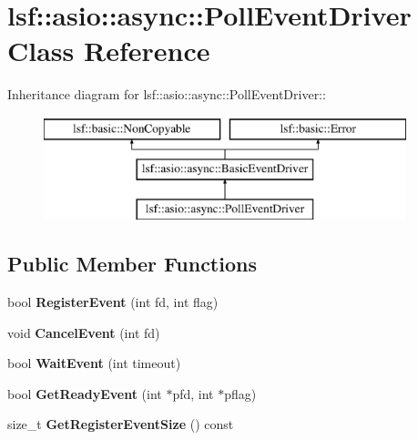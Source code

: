 \hypertarget{classlsf_1_1asio_1_1async_1_1PollEventDriver}{
\section{lsf::asio::async::PollEventDriver Class Reference}
\label{classlsf_1_1asio_1_1async_1_1PollEventDriver}
}
Inheritance diagram for lsf::asio::async::PollEventDriver::\begin{figure}[H]
\begin{center}
\leavevmode
\includegraphics[height=3cm]{classlsf_1_1asio_1_1async_1_1PollEventDriver}
\end{center}
\end{figure}
\subsection*{Public Member Functions}
\begin{DoxyCompactItemize}
\item 
\hypertarget{classlsf_1_1asio_1_1async_1_1PollEventDriver_abbdad02b28313bc8fff06d1a22b0a834}{
bool {\bfseries RegisterEvent} (int fd, int flag)}
\label{classlsf_1_1asio_1_1async_1_1PollEventDriver_abbdad02b28313bc8fff06d1a22b0a834}

\item 
\hypertarget{classlsf_1_1asio_1_1async_1_1PollEventDriver_a5149fa483470e89b631d8203cad12780}{
void {\bfseries CancelEvent} (int fd)}
\label{classlsf_1_1asio_1_1async_1_1PollEventDriver_a5149fa483470e89b631d8203cad12780}

\item 
\hypertarget{classlsf_1_1asio_1_1async_1_1PollEventDriver_a22542c55bb10a1a8085d7bdccfacd705}{
bool {\bfseries WaitEvent} (int timeout)}
\label{classlsf_1_1asio_1_1async_1_1PollEventDriver_a22542c55bb10a1a8085d7bdccfacd705}

\item 
\hypertarget{classlsf_1_1asio_1_1async_1_1PollEventDriver_a616a0889b2d564886437472169055b4c}{
bool {\bfseries GetReadyEvent} (int $\ast$pfd, int $\ast$pflag)}
\label{classlsf_1_1asio_1_1async_1_1PollEventDriver_a616a0889b2d564886437472169055b4c}

\item 
\hypertarget{classlsf_1_1asio_1_1async_1_1PollEventDriver_ac301bb0360c1b89fb041db48d27815d7}{
size\_\-t {\bfseries GetRegisterEventSize} () const }
\label{classlsf_1_1asio_1_1async_1_1PollEventDriver_ac301bb0360c1b89fb041db48d27815d7}

\end{DoxyCompactItemize}
